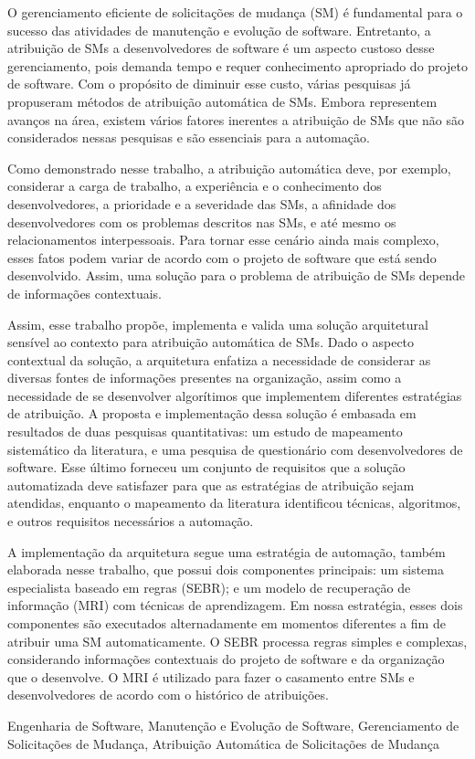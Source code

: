 O gerenciamento eficiente de solicitações de mudança (SM) é fundamental para o
sucesso das atividades de manutenção e evolução de software. Entretanto, a
atribuição de SMs a desenvolvedores de software é um aspecto custoso desse
gerenciamento, pois demanda tempo e requer conhecimento apropriado do projeto de
software. Com o propósito de diminuir esse custo, várias pesquisas já propuseram
métodos de atribuição automática de SMs. Embora representem avanços na área,
existem vários fatores inerentes a atribuição de SMs que não são considerados
nessas pesquisas e são essenciais para a automação.

Como demonstrado nesse trabalho, a atribuição automática deve, por exemplo,
considerar a carga de trabalho, a experiência e o conhecimento dos
desenvolvedores, a prioridade e a severidade das SMs, a afinidade dos
desenvolvedores com os problemas descritos nas SMs, e até mesmo os
relacionamentos interpessoais. Para tornar esse cenário ainda mais complexo,
esses fatos podem variar de acordo com o projeto de software que está sendo
desenvolvido. Assim, uma solução para o problema de atribuição de SMs depende de
informações contextuais.

Assim, esse trabalho propõe, implementa e valida uma solução arquitetural
sensível ao contexto para atribuição automática de SMs. Dado o aspecto
contextual da solução, a arquitetura enfatiza a necessidade de considerar as
diversas fontes de informações presentes na organização, assim como a
necessidade de se desenvolver algorítimos que implementem diferentes estratégias
de atribuição. A proposta e implementação dessa solução é embasada em resultados
de duas pesquisas quantitativas: um estudo de mapeamento sistemático da
literatura, e uma pesquisa de questionário com desenvolvedores de software. Esse
último forneceu um conjunto de requisitos que a solução automatizada deve
satisfazer para que as estratégias de atribuição sejam atendidas, enquanto o
mapeamento da literatura identificou técnicas, algoritmos, e outros requisitos
necessários a automação.

A implementação da arquitetura segue uma estratégia de automação, também
elabo\-rada nesse trabalho, que possui dois componentes principais: um sistema
especialista baseado em regras (SEBR); e um modelo de recuperação de informação
(MRI) com técnicas de aprendizagem. Em nossa estratégia, esses dois componentes
são executados alternadamente em momentos diferentes a fim de atribuir uma SM
automaticamente. O SEBR processa regras simples e complexas, considerando
informações contextuais do projeto de software e da organização que o
desenvolve. O MRI é utilizado para fazer o casamento entre SMs e desenvolvedores
de acordo com o histórico de atribuições.

\begin{keywords}
Engenharia de Software, Manutenção e Evolução de Software, Gerenciamento de
Solicitações de Mudança, Atribuição Automática de Solicitações de Mudança
\end{keywords}
